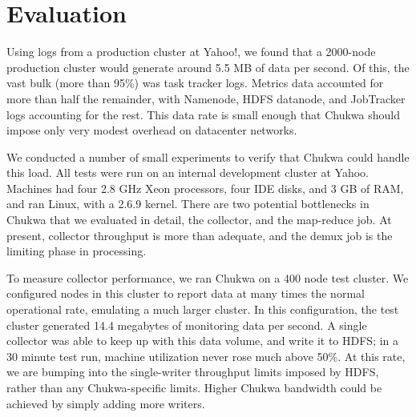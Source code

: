 \documentclass[letterpaper,twocolumn,10pt]{article}
\begin{document}
\section{Evaluation}


Using logs from a production cluster at Yahoo!, we found that a 2000-node production cluster would generate around 5.5 MB of data per second.  Of this, the vast bulk (more than 95\%) was task tracker logs.  Metrics data accounted for more than half the remainder, with Namenode, HDFS datanode, and JobTracker logs accounting for the rest. This data rate is small enough that Chukwa should impose only very modest overhead on datacenter networks. 

We conducted a number of small experiments to verify that Chukwa could handle this load.   All tests were run on an internal development cluster at Yahoo.  Machines had four 2.8 GHz Xeon processors, four IDE disks, and 3 GB of RAM, and ran Linux, with a 2.6.9 kernel.  %
There are two potential bottlenecks in Chukwa that we evaluated in detail, the collector, and the map-reduce job.  At present, collector throughput is more than adequate, and the demux job is the limiting phase in processing.

To measure collector performance, we ran Chukwa on a 400 node test cluster. We configured nodes in this cluster to report data at many times the normal operational rate, emulating a much larger cluster.  In this configuration, the test cluster generated 14.4 megabytes of monitoring data per second.  A single collector was able to keep up with this data volume, and write it to HDFS; in a 30 minute test run, machine utilization never rose much above 50\%.  At this rate, we are bumping into the single-writer throughput limits imposed by HDFS, rather than any Chukwa-specific limits. Higher Chukwa bandwidth could be achieved by simply adding more writers.

\end{document}
